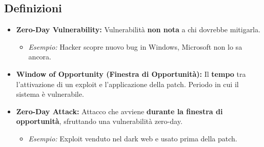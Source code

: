 \documentclass{article}
\begin{document}
\subsection{Definizioni}
\begin{itemize}
    \item \textbf{Zero-Day Vulnerability:} Vulnerabilità \textbf{non nota} a chi dovrebbe mitigarla.
        \begin{itemize}
            \item \textit{Esempio:} Hacker scopre nuovo bug in Windows, Microsoft non lo sa ancora.
        \end{itemize}
    \item \textbf{Window of Opportunity (Finestra di Opportunità):} Il \textbf{tempo} tra l'attivazione di un exploit e l'applicazione della patch. Periodo in cui il sistema è vulnerabile.
    \item \textbf{Zero-Day Attack:} Attacco che avviene \textbf{durante la finestra di opportunità}, sfruttando una vulnerabilità zero-day.
        \begin{itemize}
            \item \textit{Esempio:} Exploit venduto nel dark web e usato prima della patch.
        \end{itemize}
\end{itemize}
\end{document}
